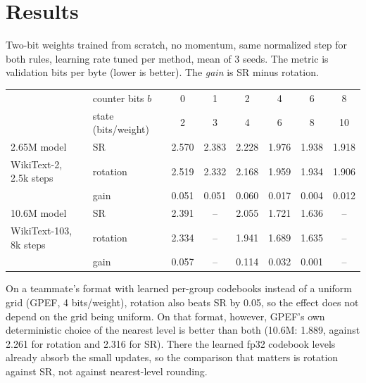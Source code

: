\documentclass[11pt,letterpaper]{article}
\theoremstyle{definition}
\newcommand{\1}{\mathbf{1}}
\begin{document}
\section{Results}
Two-bit weights trained from scratch, no momentum, same normalized step for both rules, learning rate tuned per
method, mean of 3 seeds. The metric is validation bits per byte (lower is better). The \emph{gain} is SR minus
rotation.
\begin{center}\small
\begin{tabular}{@{}llcccccc@{}}
\toprule
& counter bits $b$ & 0 & 1 & 2 & 4 & 6 & 8 \\
& state (bits/weight) & 2 & 3 & 4 & 6 & 8 & 10 \\
\midrule
2.65M model & SR & 2.570 & 2.383 & 2.228 & 1.976 & 1.938 & 1.918 \\
WikiText-2, 2.5k steps & rotation & 2.519 & 2.332 & 2.168 & 1.959 & 1.934 & 1.906 \\
& gain & 0.051 & 0.051 & 0.060 & 0.017 & 0.004 & 0.012 \\
\midrule
10.6M model & SR & 2.391 & -- & 2.055 & 1.721 & 1.636 & -- \\
WikiText-103, 8k steps & rotation & 2.334 & -- & 1.941 & 1.689 & 1.635 & -- \\
& gain & 0.057 & -- & 0.114 & 0.032 & 0.001 & -- \\
\bottomrule
\end{tabular}
\end{center}
On a teammate's format with learned per-group codebooks instead of a uniform grid (GPEF, 4 bits/weight), rotation also
beats SR by 0.05, so the effect does not depend on the grid being uniform. On that format, however, GPEF's own
deterministic choice of the nearest level is better than both (10.6M: 1.889, against 2.261 for rotation and 2.316
for SR). There the learned fp32 codebook levels already absorb the small updates, so the comparison that matters is
rotation against SR, not against nearest-level rounding.
\end{document}
